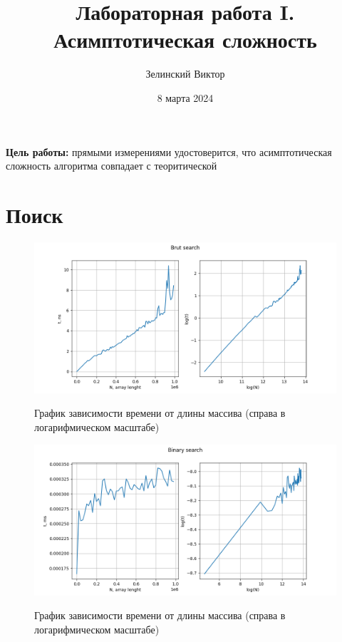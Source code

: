 \documentclass[a4paper, 12pt]{report}
\title{Лабораторная работа I.\\ Асимптотическая сложность}
\author{Зелинский Виктор}
\date{8 марта 2024}
\renewcommand{\figurename}{Рис.}
\begin{document}
	\maketitle
	\newpage
	\textbf{Цель работы:} прямыми измерениями удостоверится, что асимптотическая сложность алгоритма совпадает с теоритической  

	\section*{Поиск}

		\begin{figure}[ht!]
			\centering
			{\includegraphics[width=1\linewidth]{./brut_search/brut_search.png}}
			\caption{График зависимости времени от длины массива (справа в логарифмическом масштабе)}
			\label{fig:brut_search}
		\end{figure}
		
		\begin{figure}[ht!]
			\centering
			{\includegraphics[width=0.9\linewidth]{./bin_search/bin_search.png}}
			\caption{График зависимости времени от длины массива (справа в логарифмическом масштабе)}
			\label{fig:bin_search}
		\end{figure}
\end{document}
